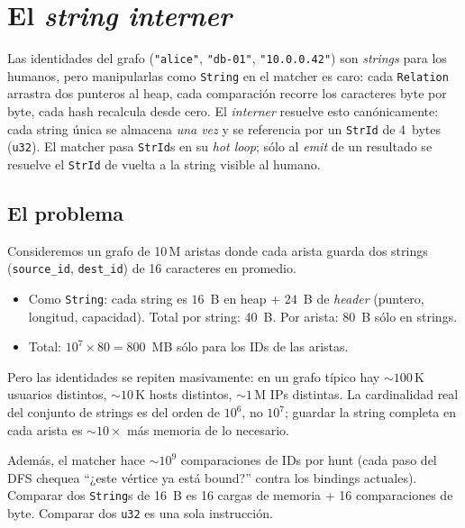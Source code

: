 \chapter{El \emph{string interner}}
\label{cap:interner}

\begin{intuicion}
Las identidades del grafo (\texttt{"alice"}, \texttt{"db-01"},
\texttt{"10.0.0.42"}) son \emph{strings} para los humanos, pero
manipularlas como \texttt{String} en el matcher es caro: cada
\texttt{Relation} arrastra dos punteros al heap, cada comparación
recorre los caracteres byte por byte, cada hash recalcula desde
cero. El \emph{interner} resuelve esto canónicamente: cada string
única se almacena \emph{una vez} y se referencia por un
\texttt{StrId} de 4~bytes (\texttt{u32}). El matcher pasa
\texttt{StrId}s en su \emph{hot loop}; sólo al \emph{emit} de un
resultado se resuelve el \texttt{StrId} de vuelta a la string
visible al humano.
\end{intuicion}

\section{El problema}

Consideremos un grafo de 10\,M aristas donde cada arista guarda dos
strings (\texttt{source\_id}, \texttt{dest\_id}) de 16 caracteres en
promedio.

\begin{itemize}
    \item Como \texttt{String}: cada string es \(16\)~B en heap +
    \(24\)~B de \emph{header} (puntero, longitud, capacidad). Total
    por string: \(40\)~B. Por arista: \(80\)~B sólo en strings.
    \item Total: \(10^7 \times 80 = 800\)~MB sólo para los IDs de
    las aristas.
\end{itemize}

\noindent
Pero las identidades se repiten masivamente: en un grafo típico hay
\(\sim 100\)\,K usuarios distintos, \(\sim 10\)\,K hosts distintos,
\(\sim 1\)\,M IPs distintas. La cardinalidad real del conjunto de
strings es del orden de \(10^6\), no \(10^7\); guardar la string
completa en cada arista es \(\sim 10\times\) más memoria de lo
necesario.

Además, el matcher hace \(\sim 10^9\) comparaciones de IDs por
hunt (cada paso del DFS chequea ``¿este vértice ya está bound?''
contra los bindings actuales). Comparar dos \texttt{String}s de 16~B
es 16 cargas de memoria + 16 comparaciones de byte. Comparar dos
\texttt{u32} es una sola instrucción.


